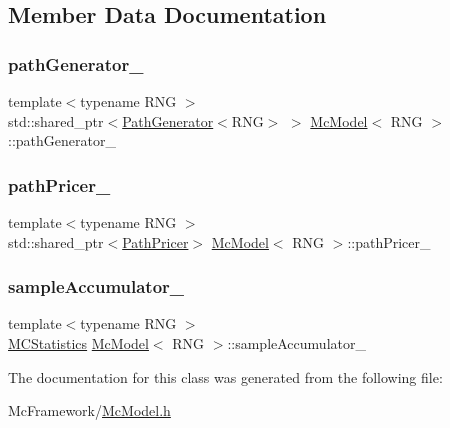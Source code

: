 \subsection{Member Data Documentation}
\hypertarget{class_mc_model_ae583ee693ceb83b83593f15e2e5e371e}{}\label{class_mc_model_ae583ee693ceb83b83593f15e2e5e371e} 
\subsubsection{\texorpdfstring{path\+Generator\+\_\+}{pathGenerator\_}}
{\footnotesize\ttfamily template$<$typename R\+NG $>$ \\
std\+::shared\+\_\+ptr$<$\hyperlink{class_path_generator}{Path\+Generator}$<$R\+NG$>$ $>$ \hyperlink{class_mc_model}{Mc\+Model}$<$ R\+NG $>$\+::path\+Generator\+\_\+\hspace{0.3cm}{\ttfamily [private]}}

\hypertarget{class_mc_model_a0936370baabb19be59052f108733279d}{}\label{class_mc_model_a0936370baabb19be59052f108733279d} 
\subsubsection{\texorpdfstring{path\+Pricer\+\_\+}{pathPricer\_}}
{\footnotesize\ttfamily template$<$typename R\+NG $>$ \\
std\+::shared\+\_\+ptr$<$\hyperlink{class_path_pricer}{Path\+Pricer}$>$ \hyperlink{class_mc_model}{Mc\+Model}$<$ R\+NG $>$\+::path\+Pricer\+\_\+\hspace{0.3cm}{\ttfamily [private]}}

\hypertarget{class_mc_model_a8fd3f9f39a642cbb8fd0f7fb3c18f919}{}\label{class_mc_model_a8fd3f9f39a642cbb8fd0f7fb3c18f919} 
\subsubsection{\texorpdfstring{sample\+Accumulator\+\_\+}{sampleAccumulator\_}}
{\footnotesize\ttfamily template$<$typename R\+NG $>$ \\
\hyperlink{class_m_c_statistics}{M\+C\+Statistics} \hyperlink{class_mc_model}{Mc\+Model}$<$ R\+NG $>$\+::sample\+Accumulator\+\_\+\hspace{0.3cm}{\ttfamily [private]}}



The documentation for this class was generated from the following file\+:\begin{DoxyCompactItemize}
\item 
Mc\+Framework/\hyperlink{_mc_model_8h}{Mc\+Model.\+h}\end{DoxyCompactItemize}
